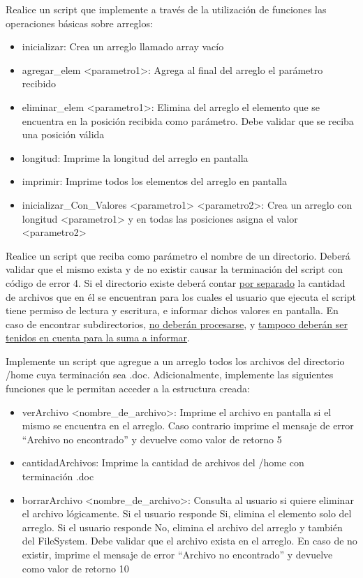 \begin{questions}
\item Realice un script que implemente a través de la utilización de funciones las operaciones básicas sobre arreglos:
\begin{itemize}
\item inicializar: Crea un arreglo llamado array vacío
\item agregar\_elem <parametro1>: Agrega al final del arreglo el parámetro recibido
\item eliminar\_elem <parametro1>: Elimina del arreglo el elemento que se encuentra en la posición recibida como parámetro. Debe validar que se reciba una posición válida
\item longitud: Imprime la longitud del arreglo en pantalla
\item imprimir: Imprime todos los elementos del arreglo en pantalla
\item inicializar\_Con\_Valores <parametro1> <parametro2>: Crea un arreglo con longitud <parametro1> y en todas las posiciones asigna el valor <parametro2>
\end{itemize}

\item Realice un script que reciba como parámetro el nombre de un directorio. Deberá validar que el mismo exista y de no existir causar la terminación del script con código de error 4. Si el directorio existe deberá contar \underline{por separado} la cantidad de archivos que en él se encuentran para los cuales el usuario que ejecuta el script tiene permiso de lectura y escritura, e informar dichos valores en pantalla. En caso de encontrar subdirectorios, \underline{no deberán procesarse}, y \underline{tampoco deberán ser tenidos en cuenta para la suma a informar}.

\item Implemente un script que agregue a un arreglo todos los archivos del directorio /home cuya terminación sea .doc. Adicionalmente, implemente las siguientes funciones que le permitan acceder a la estructura creada:
\begin{itemize}
\item verArchivo <nombre\_de\_archivo>: Imprime el archivo en pantalla si el mismo se encuentra en el arreglo. Caso contrario imprime el mensaje de error “Archivo no encontrado” y devuelve como valor de retorno 5
\item cantidadArchivos: Imprime la cantidad de archivos del /home con terminación .doc
\item borrarArchivo <nombre\_de\_archivo>: Consulta al usuario si quiere eliminar el archivo lógicamente. Si el usuario responde Si, elimina el elemento solo del arreglo. Si el usuario responde No, elimina el archivo del arreglo y también del FileSystem. Debe validar que el archivo exista en el arreglo. En caso de no existir, imprime el mensaje de error “Archivo no encontrado” y devuelve como valor de retorno 10
\end{itemize}


\end{questions}
